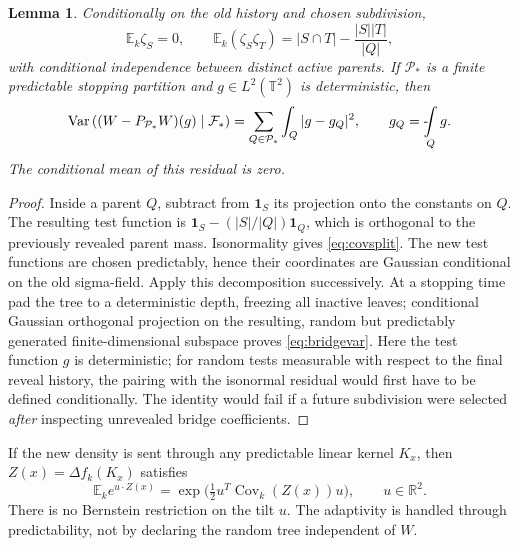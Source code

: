 \documentclass[11pt]{article}
\newtheorem{lemma}[lemma]{Lemma}
\theoremstyle{definition}
\theoremstyle{remark}
\numberwithin{equation}{section}
\newcommand{\T}{\mathbb T}
\newcommand{\R}{\mathbb R}
\newcommand{\E}{\mathbb E}
\newcommand{\F}{\mathcal F}
\newcommand{\pr}{\mathcal P}
\newcommand{\one}{\mathbf 1}
\renewcommand{\fint}{\mathop{\rlap{-}\!\int}}
\begin{document}
\begin{lemma}\label{lem:bridge}
Conditionally on the old history and chosen subdivision,
\begin{equation}\label{eq:covsplit}
 \E_k\zeta_S=0,\qquad
 \E_k(\zeta_S\zeta_T)=|S\cap T|-\frac{|S||T|}{|Q|},
\end{equation}
with conditional independence between distinct active parents. If $\pr_*$ is a finite predictable stopping partition and
$g\in L^2(\T^2)$ is deterministic, then
\begin{equation}\label{eq:bridgevar}
 \operatorname{Var}\left((W-P_{\pr_*}W)(g)\mid\F_*\right)
 =\sum_{Q\in\pr_*}\int_Q|g-g_Q|^2,
 \qquad g_Q=\fint_Qg.
\end{equation}
The conditional mean of this residual is zero.
\end{lemma}
\begin{proof}
Inside a parent $Q$, subtract from $\one_S$ its projection onto the constants on
$Q$. The resulting test function is
$\one_S-(|S|/|Q|)\one_Q$, which is orthogonal to the previously revealed
parent mass. Isonormality gives \eqref{eq:covsplit}. The new test functions are
chosen predictably, hence their coordinates are Gaussian conditional on the old
sigma-field. Apply this decomposition successively. At a stopping time pad the
tree to a deterministic depth, freezing all inactive leaves; conditional Gaussian
orthogonal projection on the resulting, random but predictably generated
finite-dimensional subspace proves \eqref{eq:bridgevar}. Here the test function
$g$ is deterministic; for random tests measurable with respect to the final
reveal history, the pairing with the isonormal residual would first have to be
defined conditionally. The identity would fail if a future subdivision were
selected \emph{after} inspecting unrevealed bridge coefficients.
\end{proof}

If the new density is sent through any predictable linear kernel $K_x$,
then $Z(x)=\Delta f_k(K_x)$ satisfies
\begin{equation}\label{eq:mgflinear}
 \E_k e^{u\cdot Z(x)}
 =\exp\bigl(\tfrac12u^T\operatorname{Cov}_k(Z(x))u\bigr),
 \qquad u\in\R^2.
\end{equation}
There is no Bernstein restriction on the tilt $u$. The adaptivity is handled
through predictability, not by declaring the random tree independent of $W$.
\end{document}
